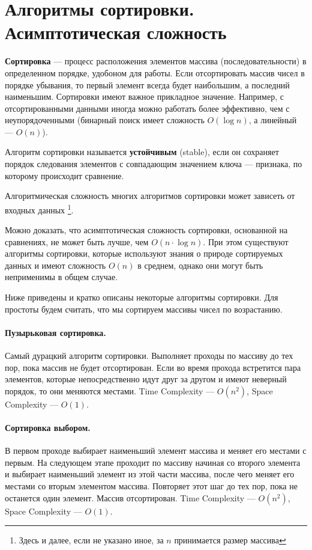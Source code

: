 \documentclass[14pt, a4paper]{extarticle}
\begin{document}
\section{Алгоритмы сортировки. Асимптотическая сложность}
\textbf{Сортировка} --- процесс расположения элементов массива (последовательности) в определенном
порядке, удобоном для работы. Если отсортировать массив чисел в порядке убывания, то первый элемент
всегда будет наибольшим, а последний наименьшим.
Сортировки имеют важное прикладное значение. Например, с отсортированными данными иногда можно
работать более эффективно, чем с неупорядоченными (бинарный поиск имеет сложность $O(\log n)$, а
линейный --- $O(n)$).

Алгоритм сортировки называется \textbf{устойчивым} (stable), если он сохраняет порядок следования
элементов с совпадающим значением ключа --- признака, по которому происходит сравнение.

Алгоритмическая сложность многих алгоритмов сортировки может зависеть от входных данных
\footnote{Здесь и далее, если не указано иное, за $n$ принимается размер массива}.

Можно доказать, что асимптотическая сложность сортировки, основанной на сравнениях, не может
быть лучше, чем $O(n\cdot \log n)$. При этом существуют алгоритмы сортировки, которые используют
знания о природе сортируемых данных и имеют сложность $O(n)$ в среднем, однако они могут быть
неприменимы в общем случае.

Ниже приведены и кратко описаны некоторые алгоритмы сортировки. Для простоты будем считать,
что мы сортируем массивы чисел по возрастанию.

\paragraph{Пузырьковая сортировка.} Самый дурацкий алгоритм сортировки. Выполняет проходы по массиву
до тех пор, пока массив не будет отсортирован. Если во время прохода встретится пара элементов, которые
непосредственно идут друг за другом и имеют неверный порядок, то они меняются местами. Time Complexity --- $O(n^2)$,
Space Complexity --- $O(1)$.

\paragraph{Сортировка выбором.} В первом проходе выбирает наименьший элемент массива и меняет его местами с первым.
На следующем этапе проходит по массиву начиная со второго элемента и выбирает наименьший элемент из этой части массива,
после чего меняет его местами со вторым элементом массива. Повторяет этот шаг до тех пор, пока не останется один
элемент. Массив отсортирован. Time Complexity --- $O(n^2)$, Space Complexity --- $O(1)$.
\end{document}
